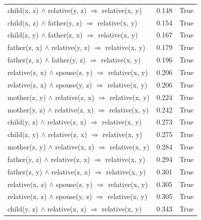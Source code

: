 \begin{longtable}{lrl}
   child(x, z) $\wedge$ relative(y, z)   $\Rightarrow$ relative(x, y) &           0.148 &                     True \\
     child(x, z) $\wedge$ father(y, z)   $\Rightarrow$ relative(x, y) &           0.154 &                     True \\
     child(z, y) $\wedge$ father(z, x)   $\Rightarrow$ relative(x, y) &           0.167 &                     True \\
  father(z, x) $\wedge$ relative(y, z)   $\Rightarrow$ relative(x, y) &           0.179 &                     True \\
    father(z, x) $\wedge$ father(y, z)   $\Rightarrow$ relative(x, y) &           0.196 &                     True \\
  relative(z, x) $\wedge$ spouse(z, y)   $\Rightarrow$ relative(x, y) &           0.206 &                     True \\
  relative(z, x) $\wedge$ spouse(y, z)   $\Rightarrow$ relative(x, y) &           0.206 &                     True \\
  mother(z, y) $\wedge$ relative(z, x)   $\Rightarrow$ relative(x, y) &           0.224 &                     True \\
  mother(y, z) $\wedge$ relative(z, x)   $\Rightarrow$ relative(x, y) &           0.242 &                     True \\
   child(y, z) $\wedge$ relative(z, x)   $\Rightarrow$ relative(x, y) &           0.273 &                     True \\
   child(z, y) $\wedge$ relative(z, x)   $\Rightarrow$ relative(x, y) &           0.275 &                     True \\
  mother(z, y) $\wedge$ relative(x, z)   $\Rightarrow$ relative(x, y) &           0.284 &                     True \\
  father(y, z) $\wedge$ relative(z, x)   $\Rightarrow$ relative(x, y) &           0.294 &                     True \\
  father(z, y) $\wedge$ relative(z, x)   $\Rightarrow$ relative(x, y) &           0.301 &                     True \\
  relative(x, z) $\wedge$ spouse(z, y)   $\Rightarrow$ relative(x, y) &           0.305 &                     True \\
  relative(x, z) $\wedge$ spouse(y, z)   $\Rightarrow$ relative(x, y) &           0.305 &                     True \\
   child(y, z) $\wedge$ relative(x, z)   $\Rightarrow$ relative(x, y) &           0.343 &                     True \\

\end{longtable}
